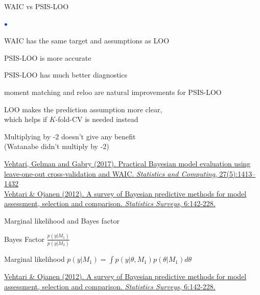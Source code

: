 \documentclass[english,t]{beamer}
\newenvironment{list1}{
   \begin{list}{$\color{list1}\bullet$}{\itemsep=6pt}}{
  \end{list}}
\begin{document}
\begin{frame}{WAIC vs PSIS-LOO}

\begin{list1}
  \item<+-> WAIC has the same target and assumptions as LOO
  \item<+-> PSIS-LOO is more accurate 
  \item<+-> PSIS-LOO has much better diagnostics
  \item<+-> moment matching and reloo are natural improvements for PSIS-LOO
  \item<5-> LOO makes the prediction assumption more clear,\\ which
    helps if $K$-fold-CV is needed instead
  \item<6-> Multiplying by -2 doesn't give any benefit\\ (Watanabe
    didn't multiply by -2)
\end{list1}

{\color{gray}\footnotesize \href{http://link.springer.com/article/10.1007/s11222-016-9696-4}{Vehtari, Gelman and Gabry (2017). Practical Bayesian model evaluation using leave-one-out cross-validation and WAIC. \textit{Statistics and Computing}, 27(5):1413–1432}\\
\href{http://dx.doi.org/10.1214/12-SS102}{Vehtari \& Ojanen (2012). A survey of Bayesian predictive methods for model assessment, selection and comparison. \textit{Statistics Surveys}, 6:142-228.}}

\end{frame}

\begin{frame}[fragile]{Marginal likelihood and Bayes factor}

  Bayes Factor $\frac{p(y|M_1)}{p(y|M_2)}$

  Marginal likelihood $p(y|M_1) = \int p(y|\theta,M_1)p(\theta|M_1)d\theta$


{\color{gray}\footnotesize
  \href{http://dx.doi.org/10.1214/12-SS102}{Vehtari \& Ojanen (2012). A survey of Bayesian predictive methods for model assessment, selection and comparison. \textit{Statistics Surveys}, 6:142-228.}\\
}

\end{frame}
\end{document}
